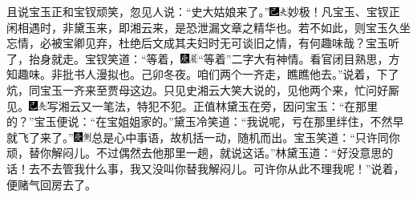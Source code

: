 且说宝玉正和宝钗顽笑，忽见人说：“史大姑娘来了。”{\includegraphics[width=3mm]{../Images/00003}\includegraphics[width=3mm]{../Images/00012}\footnotesize \kaishu 妙极！凡宝玉、宝钗正闲相遇时，非黛玉来，即湘云来，是恐泄漏文章之精华也。若不如此，则宝玉久坐忘情，必被宝卿见弃，杜绝后文成其夫妇时无可谈旧之情，有何趣味哉？}宝玉听了，抬身就走。宝钗笑道：“等着，{\includegraphics[width=3mm]{../Images/00004}\includegraphics[width=3mm]{../Images/00010}\footnotesize \kaishu “等着”二字大有神情。看官闭目熟思，方知趣味。非批书人漫拟也。己卯冬夜。}咱们两个一齐走，瞧瞧他去。”说着，下了炕，同宝玉一齐来至贾母这边。只见史湘云大笑大说的，见他两个来，忙问好厮见。{\includegraphics[width=3mm]{../Images/00003}\includegraphics[width=3mm]{../Images/00012}\footnotesize \kaishu 写湘云又一笔法，特犯不犯。}正值林黛玉在旁，因问宝玉：“在那里的？”宝玉便说：“在宝姐姐家的。”黛玉冷笑道：“我说呢，亏在那里绊住，不然早就飞了来了。”{\includegraphics[width=3mm]{../Images/00004}\includegraphics[width=3mm]{../Images/00011}\footnotesize \kaishu 总是心中事语，故机括一动，随机而出。}宝玉笑道：“只许同你顽，替你解闷儿。不过偶然去他那里一趟，就说这话。”林黛玉道：“好没意思的话！去不去管我什么事，我又没叫你替我解闷儿。可许你从此不理我呢！”说着，便赌气回房去了。

